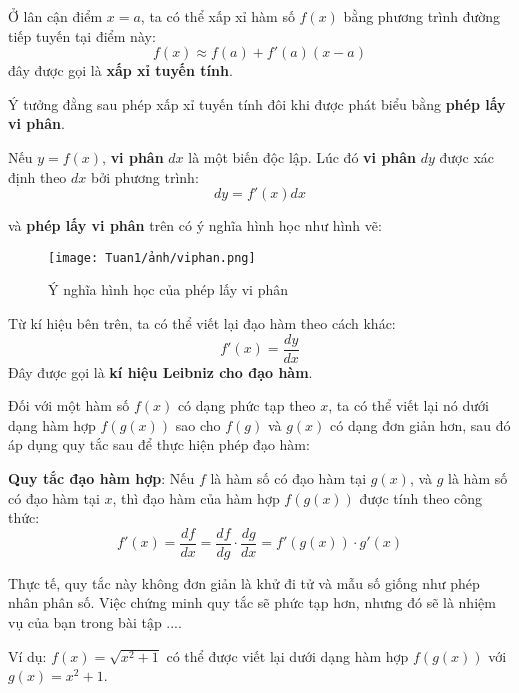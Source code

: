 \begin{definition}
    Ở lân cận điểm $x=a$, ta có thể xấp xỉ hàm số $f(x)$ bằng phương trình đường tiếp tuyến tại điểm này:
\begin{equation}
        f(x)\approx f(a)+f'(a)(x-a)
    \end{equation}
đây được gọi là \textbf{xấp xỉ tuyến tính}.
\end{definition}
Ý tưởng đằng sau phép xấp xỉ tuyến tính đôi khi được phát biểu bằng \textbf{phép lấy vi phân}.

\begin{definition}
    Nếu $y=f(x)$, \textbf{vi phân} $dx$ là một biến độc lập. Lúc đó \textbf{vi phân} $dy$ được xác định theo $dx$ bởi phương trình:
\begin{equation}
    dy=f'(x)dx
\end{equation}
\end{definition}
và \textbf{phép lấy vi phân} trên có ý nghĩa hình học như hình vẽ:

\begin{figure}[H]
\centering
\texttt{[image: Tuan1/ảnh/viphan.png]}
\caption{Ý nghĩa hình học của phép lấy vi phân}
\end{figure}
Từ kí hiệu bên trên, ta có thể viết lại đạo hàm theo cách khác:
\begin{equation}
    f'(x)=\frac{dy}{dx} 
\end{equation}
Đây được gọi là \textbf{kí hiệu Leibniz cho đạo hàm}.

Đối với một hàm số \(f(x)\) có dạng phức tạp theo \(x\), ta có thể viết lại nó dưới dạng hàm hợp \(f(g(x))\) sao cho \(f(g)\) và \(g(x)\) có dạng đơn giản hơn, sau đó áp dụng quy tắc sau để thực hiện phép đạo hàm:
\begin{definition}
\textbf{Quy tắc đạo hàm hợp}: Nếu \(f\) là hàm số có đạo hàm tại \(g(x)\), và \(g\) là hàm số có đạo hàm tại \(x\), thì đạo hàm của hàm hợp \(f(g(x))\) được tính theo công thức:
\begin{equation}
    f'(x)=\frac{df}{dx}=\frac{df}{dg}\cdot\frac{dg}{dx}=f'(g(x))\cdot g'(x)
\end{equation}
\end{definition}
Thực tế, quy tắc này không đơn giản là khử đi tử và mẫu số giống như phép nhân phân số. Việc chứng minh quy tắc sẽ phức tạp hơn, nhưng đó sẽ là nhiệm vụ của bạn trong bài tập ....

Ví dụ: \(f(x)=\sqrt{x^2+1}\) có thể được viết lại dưới dạng hàm hợp \(f(g(x))\) với \(g(x)=x^2+1\).